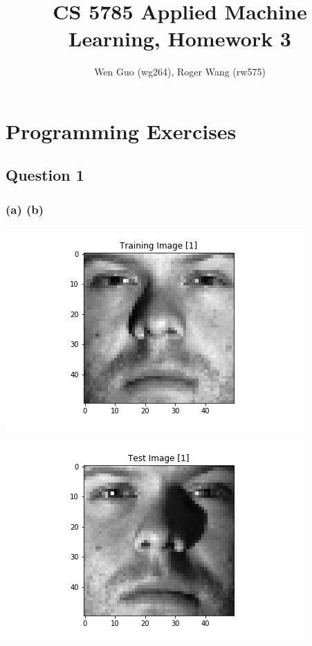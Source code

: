 \documentclass[12pt]{article}
\begin{document}
\title{CS 5785 Applied Machine Learning, Homework 3}
\author{Wen Guo (wg264), Roger Wang (rw575)}
\maketitle

{\parindent0pt
\section*{Programming Exercises}
\subsection*{Question 1}
\subsubsection*{(a) (b)}
\begin{center}
\includegraphics[width=0.8\linewidth]{P1/Training_Image_[1].png}
\end{center}

\begin{center}
\includegraphics[width=0.8\linewidth]{P1/Test_Image_[1].png}
\end{center}

}
\end{document}
